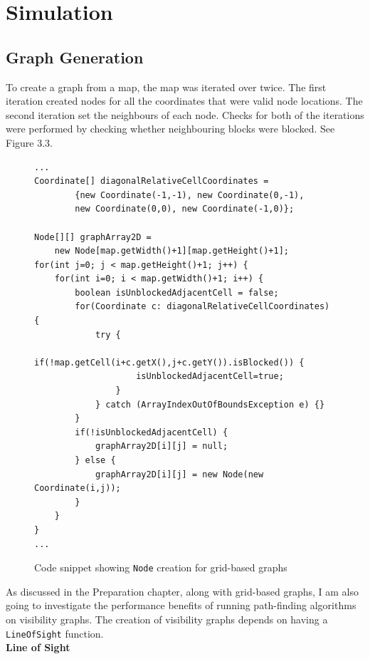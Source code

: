 \documentclass[12pt,twoside,notitlepage]{report}
\begin{document}
\newpage
\section{Simulation}

\subsection{Graph Generation}

To create a graph from a map, the map was iterated over twice. The first iteration created nodes for all the coordinates that were valid node locations. The second iteration set the neighbours of each node. Checks for both of the iterations were performed by checking whether neighbouring blocks were blocked. See Figure 3.3.\\

\begin{figure}
\begin{lstlisting}
...
Coordinate[] diagonalRelativeCellCoordinates = 
		{new Coordinate(-1,-1), new Coordinate(0,-1), 
		new Coordinate(0,0), new Coordinate(-1,0)};
		
Node[][] graphArray2D = 
	new Node[map.getWidth()+1][map.getHeight()+1];
for(int j=0; j < map.getHeight()+1; j++) {
	for(int i=0; i < map.getWidth()+1; i++) {
		boolean isUnblockedAdjacentCell = false;
		for(Coordinate c: diagonalRelativeCellCoordinates) {
			try {
				if(!map.getCell(i+c.getX(),j+c.getY()).isBlocked()) {
					isUnblockedAdjacentCell=true;
				}
			} catch (ArrayIndexOutOfBoundsException e) {}
		}
		if(!isUnblockedAdjacentCell) {
			graphArray2D[i][j] = null;
		} else {
			graphArray2D[i][j] = new Node(new Coordinate(i,j));
		}
	}
}
...
\end{lstlisting}
\caption{Code snippet showing {\tt Node} creation for grid-based graphs}
\end{figure}

\noindent
As discussed in the Preparation chapter, along with grid-based graphs, I am also going to investigate the performance benefits of running path-finding algorithms on visibility graphs. The creation of visibility graphs depends on having a {\tt LineOfSight} function.\\

\noindent
{\bf Line of Sight}\\
\end{document}
